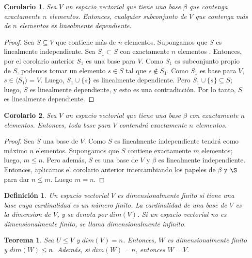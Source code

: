 \documentclass{book}
\newtheorem{theorem}{Teorema}
\newtheorem{definition}{Definición}
\newtheorem{corollary}{Corolario}
\begin{document}
\begin{corollary}
Sea $V$ un espacio vectorial que tiene una base $\beta$ que contenga exactamente $n$ elementos. Entonces, cualquier subconjunto de $V$ que contenga más de $n$ elementos es linealmente dependiente.
\end{corollary}

\begin{proof}
Sea $S\subseteq V$ que contiene más de $n$ elementos. 	Supongamos que $S$ es linealmente independiente. Sea $S_1 \subset S$ con exactamente $n$ elementos . Entonces, por el corolario anterior $S_1$ es una base para $V$. Como $S_1$ es subconjunto propio de $S$, podemos tomar un elemento $s\in S$ tal que $s\notin S_1$. Como $S_1$ es base para $V$, $s\in \langle S_1 \rangle =V$. Luego, $S_1 \cup \{s\}$ es linealmente dependiente. Pero $S_1 \cup \{s\} \subseteq S$; luego, $S$ es linealmente dependiente, y esto es una contradicción. Por lo tanto, $S$ es linealmente dependiente.

\end{proof}

\begin{corollary}
Sea $V$ un espacio vectorial que tiene una base $\beta$ con exactamente $n$ elementos. Entonces, toda base para $V$ contendrá exactamente $n$ elementos.
\end{corollary}

\begin{proof}
Sea $S$ una base de $V$. Como $S$ es linealmente independiente tendrá como máximo $n$ elementos. Supongamos que $S$ contiene exactamente $m$ elementos; luego, $m\leq n$. Pero además, $S$ es una base de $V$ y $\beta$ es linealmente independiente. Entonces, aplicamos el corolario anterior intercambiando los papeles de $\beta$ y $\S$ para dar $n \leq m$. Luego $m=n$.
\end{proof}

\begin{definition}
Un espacio vectorial $V$ es dimensionalmente finito  si tiene una base cuya cardinalidad es un número finito. La cardinalidad de una base de $V$ es la dimension de $V$, y se denota por $dim(V)$. Si un espacio vectorial no es dimensionalmente finito, se llama dimensionalmente infinito.
\end{definition}

\begin{theorem}
Sea $U\leq V$ y $dim(V)=n$. Entonces, $W$ es dimensionalmente finito y $dim(W)\leq n$. Además, si $dim(W)=n$, entonces $W=V$.
\end{theorem}
\end{document}
